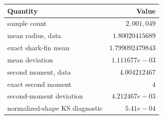 \begin{center}
\begin{tabular}{@{}lr@{}}
\toprule
Quantity & Value\\
\midrule
sample count & $2,001,049$\\
mean radius, data & $1.80020415689$\\
exact shark-fin mean & $1.799092479843$\\
mean deviation & $1.111677e-03$\\
second moment, data & $4.004212467$\\
exact second moment & $4$\\
second-moment deviation & $4.212467e-03$\\
normalized-shape KS diagnostic & $5.41e-04$\\
\bottomrule
\end{tabular}
\end{center}

